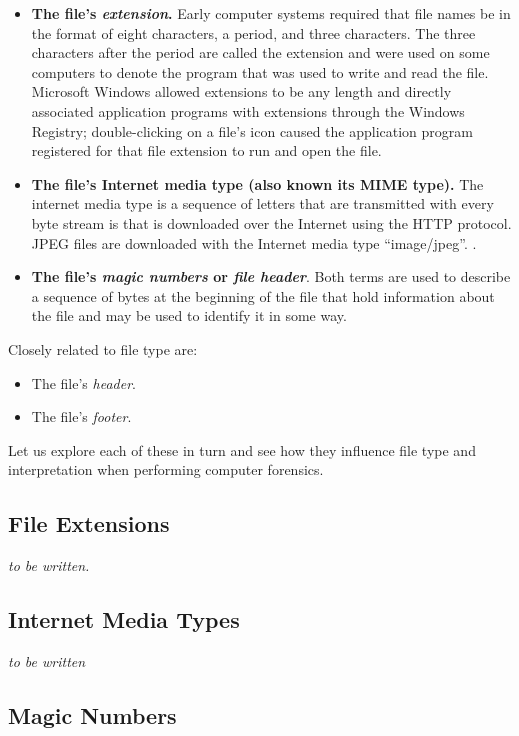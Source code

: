 \documentclass[11pt,letter]{article}
\begin{document}
\begin{itemize}
\item \textbf{The file's \emph{extension}.} Early computer systems
  required that file names be in the format of eight characters, a
  period, and three characters. The three characters after the period
  are called the extension and were used on some computers to denote
  the program that was used to write and read the file. Microsoft
  Windows allowed extensions to be any length and directly associated
  application programs with extensions through the Windows Registry;
  double-clicking on a file's icon caused the application program
  registered for that file extension to run and open the file.
\item \textbf{The file's Internet media type (also known its MIME
  type).} The internet media type is a sequence of letters that are
  transmitted with every byte stream is that is downloaded over the
  Internet using the HTTP protocol. JPEG files are downloaded with the
  Internet media type ``image/jpeg''. . 
\item \textbf{The file's \emph{magic numbers} or \emph{file
    header}}. Both terms are used to describe a sequence of bytes at the
  beginning of the file that hold information about the file and may
  be used to identify it in some way.
\end{itemize}

Closely related to file type are:
\begin{itemize}
\item The file's \emph{header}.
\item The file's \emph{footer}.
\end{itemize}

Let us explore each of these in turn and see how they influence
file type and interpretation when performing computer forensics.

\subsection{File Extensions}

\emph{to be written.}

\subsection{Internet Media Types}

\emph{to be written}

\subsection{Magic Numbers}
\end{document}
